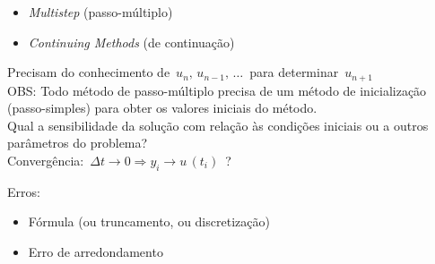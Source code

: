 \begin{itemize}

\item \textit{Multistep} (passo-múltiplo)

\item \textit{Continuing Methods} (de continuação)

\end{itemize}

Precisam do conhecimento de $ \, u_n, \, u_{n-1}, \, \ldots \, $ para determinar $ \, u_{n+1} \, $\\

OBS: Todo método de passo-múltiplo precisa de um método de inicialização (passo-simples) para obter os valores iniciais do método.\\

Qual a sensibilidade da solução com relação às condições iniciais ou a outros parâmetros do problema?\\

Convergência: $ \, \Delta t \rightarrow 0 \Rightarrow y_i \rightarrow u \, (t_i) \, $ ?

Erros:

\begin{itemize}

\item Fórmula (ou truncamento, ou discretização)

\item Erro de arredondamento

\end{itemize}

